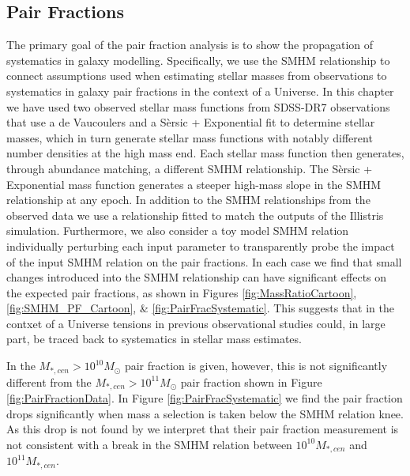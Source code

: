\subsection{Pair Fractions}

The primary goal of the pair fraction analysis is to show the propagation of systematics in galaxy modelling. 
Specifically, we use the SMHM relationship to connect assumptions used when estimating stellar masses from observations to systematics in galaxy pair fractions in the context of a \LCDM Universe. 
In this chapter we have used two observed stellar mass functions from SDSS-DR7 observations that use a de Vaucoulers and a S\`ersic + Exponential fit to determine stellar masses, which in turn generate stellar mass functions with notably different number densities at the high mass end. Each stellar mass function then generates, through abundance matching, a different SMHM relationship. The S\`ersic + Exponential mass function generates a steeper high-mass slope in the SMHM relationship at any epoch.
In addition to the SMHM relationships from the observed data we use a relationship fitted to match the outputs of the Illistris simulation. Furthermore, we also consider a toy model SMHM relation individually perturbing each input parameter to transparently probe the impact of the input SMHM relation on the pair fractions.
In each case we find that small changes introduced into the SMHM relationship can have significant effects on the expected pair fractions, as shown in Figures \ref{fig:MassRatioCartoon},\ref{fig:SMHM_PF_Cartoon}, \& \ref{fig:PairFracSystematic}.
This suggests that in the contxet of a \LCDM Universe tensions in previous observational studies could, in large part, be traced back to systematics in stellar mass estimates.

In \citet{Mundy2017A3.5} the $M_{*,cen} > 10^{10} M_{\odot}$ pair fraction is given, however, this is not significantly different from the $M_{*,cen} > 10^{11} M_{\odot}$ pair fraction shown in Figure \ref{fig:PairFractionData}. In Figure \ref{fig:PairFracSystematic} we find the pair fraction drops significantly when mass a selection is taken below the SMHM relation knee. As this drop is not found by \citet{Mundy2017A3.5} we interpret that their pair fraction measurement is not consistent with a break in the SMHM relation between $10^{10} M_{*,cen}$ and $10^{11} M_{*,cen}$.

